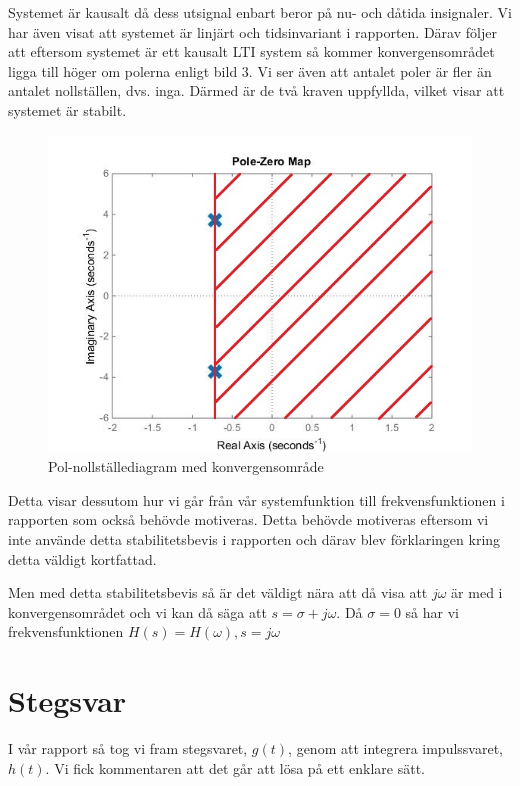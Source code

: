 \documentclass[10pt,a4paper]{article}
\begin{document}
Systemet är kausalt då dess utsignal enbart beror på nu- och dåtida insignaler. Vi har även visat att systemet är linjärt och tidsinvariant i rapporten. Därav följer att eftersom systemet är ett kausalt LTI system så kommer konvergensområdet ligga till höger om polerna enligt bild 3. Vi ser även att antalet poler är fler än antalet nollställen, dvs. inga. Därmed är de två kraven uppfyllda, vilket visar att systemet är stabilt.

\begin{figure}[h]
\begin{center}
\includegraphics[scale=0.6]{nolpol-diagram_konvergens}
\caption{Pol-nollställediagram med konvergensområde}
\end{center}
\end{figure}

Detta visar dessutom hur vi går från vår systemfunktion till frekvensfunktionen i rapporten som också behövde motiveras. Detta behövde motiveras eftersom vi inte använde detta stabilitetsbevis i rapporten och därav blev förklaringen kring detta väldigt kortfattad. 

Men med detta stabilitetsbevis så är det väldigt nära att då visa att $j\omega$ är med i konvergensområdet och vi kan då säga att $s = \sigma + j\omega$. Då $\sigma = 0$ så har vi frekvensfunktionen $H(s) = H(\omega), s = j\omega$
\newpage
\section{Stegsvar}

I vår rapport så tog vi fram stegsvaret, $g(t)$, genom att integrera impulssvaret, $h(t)$. Vi fick kommentaren att det går att lösa på ett enklare sätt. 
\end{document}
